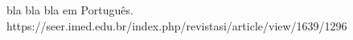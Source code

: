 \begin{resumo} 
  bla bla bla em Português. \newline
  https://seer.imed.edu.br/index.php/revistasi/article/view/1639/1296
\end{resumo}